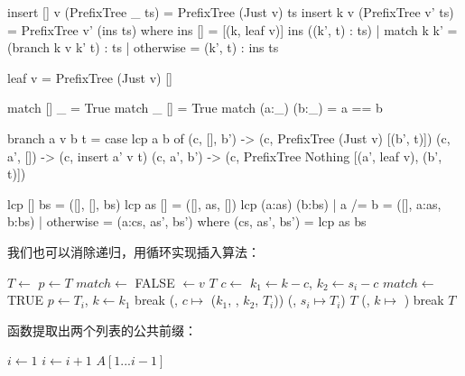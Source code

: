 \documentclass[b5paper]{ctexart}
\begin{document}
\begin{Haskell}
insert [] v (PrefixTree _ ts) = PrefixTree (Just v) ts
insert k v (PrefixTree v' ts) = PrefixTree v' (ins ts) where
    ins [] = [(k, leaf v)]
    ins ((k', t) : ts) | match k k' = (branch k v k' t) : ts
                       | otherwise  = (k', t) : ins ts

leaf v = PrefixTree (Just v) []

match [] _ = True
match _ [] = True
match (a:_) (b:_) = a == b

branch a v b t = case lcp a b of
  (c, [], b') -> (c, PrefixTree (Just v) [(b', t)])
  (c, a', []) -> (c, insert a' v t)
  (c, a', b') -> (c, PrefixTree Nothing [(a', leaf v), (b', t)])

lcp [] bs = ([], [], bs)
lcp as [] = ([], as, [])
lcp (a:as) (b:bs) | a /= b = ([], a:as, b:bs)
                  | otherwise = (a:cs, as', bs') where
                        (cs, as', bs') = lcp as bs
\end{Haskell}

我们也可以消除递归，用循环实现插入算法：

\begin{algorithmic}[1]
   \State $T \gets$ 
  \EndIf
  \State $p \gets T$
  \Loop
    \State $match \gets$ FALSE
        \State {} $\gets v$ 
        \State \Return $T$
      \EndIf
      \State $c \gets$ 
      \State $k_1 \gets k - c$, $k_2 \gets s_i - c$
        \State $match \gets$ TRUE
         
          \State $p \gets T_i$, $k \gets k_1$
          \State break
        \Else {}
          \State {}(, $c \mapsto$ ($k_1$, , $k_2$, $T_i$))
          \State {}(, $s_i \mapsto T_i$)
          \State \Return $T$
        \EndIf
      \EndIf
    \EndFor
     
      \State {}(, $k \mapsto$ )
      \State break
    \EndIf
  \EndLoop
  \State \Return $T$
\EndFunction
\end{algorithmic}

函数提取出两个列表的公共前缀：

\begin{algorithmic}[1]
  \State $i \gets 1 $
    \State $i \gets i + 1$
  \EndWhile
  \State \Return $A[1...i-1]$
\EndFunction
\end{algorithmic}
\end{document}
